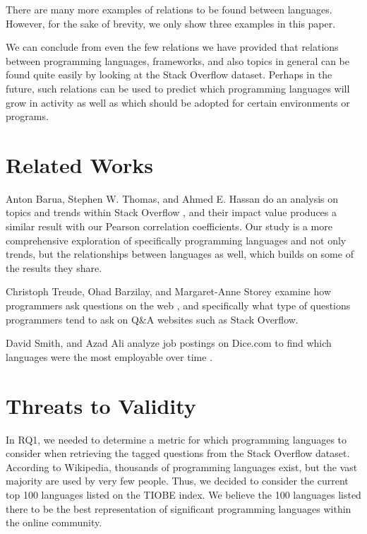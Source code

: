 \documentclass[conference]{IEEEtran}
\begin{document}
There are many more examples of relations to be found between languages. However, for the sake of brevity, we only show three examples in this paper.

We can conclude from even the few relations we have provided that relations between programming languages, frameworks, and also topics in general can be found quite easily by looking at the Stack Overflow dataset. Perhaps in the future, such relations can be used to predict which programming languages will grow in activity as well as which should be adopted for certain environments or programs.

\section{Related Works}

Anton Barua, Stephen W. Thomas, and Ahmed E. Hassan do an analysis on topics and trends within Stack Overflow \cite{SOtalking}, and their impact value produces a similar result with our Pearson correlation coefficients. Our study is a more comprehensive exploration of specifically programming languages and not only trends, but the relationships between languages as well, which builds on some of the results they share.

Christoph Treude, Ohad Barzilay, and Margaret-Anne Storey examine how programmers ask questions on the web \cite{progquestions}, and specifically what type of questions programmers tend to ask on Q\&A websites such as Stack Overflow.

David Smith, and Azad Ali analyze job postings on Dice.com to find which languages were the most employable over time \cite{jobanalyze}. 

\vspace{5mm}


\section{Threats to Validity}

In RQ1, we needed to determine a metric for which programming languages to consider when retrieving the tagged questions from the Stack Overflow dataset. According to Wikipedia, thousands of programming languages exist, but the vast majority are used by very few people. Thus, we decided to consider the current top 100 languages listed on the TIOBE index. We believe the 100 languages listed there to be the best representation of significant programming languages within the online community.
\end{document}
